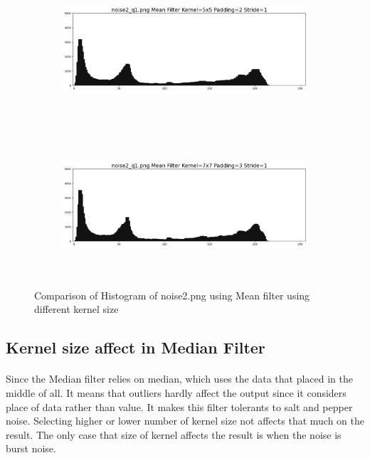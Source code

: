 \documentclass[12pt,a4paper]{report}
\begin{document}
\begin{figure}[!htb]
\begin{minipage}{\linewidth}
    \begin{subfigure}{1\textwidth}
      \includegraphics[height=5.3cm]{output/noise2_q1_K5P2_his.png}
    \end{subfigure}
    \begin{subfigure}{1\textwidth}
      \includegraphics[height=5.3cm]{output/noise2_q1_K7P3_his.png}
    \end{subfigure}
    
  \caption{Comparison of Histogram of noise2.png using Mean filter using different kernel size}
\label{fig:n2-mean-hist}
\end{minipage}
\end{figure}
\clearpage


\subsection{Kernel size affect in Median Filter}
\paragraph*{}
Since the Median filter relies on median, which uses the data that placed in the middle of all. It means that outliers hardly affect the output since it considers place of data rather than value. It makes this filter tolerants to salt and pepper noise. Selecting higher or lower number of kernel size not affects that much on the result. The only case that size of kernel affects the result is when the noise is burst noise.
\end{document}
